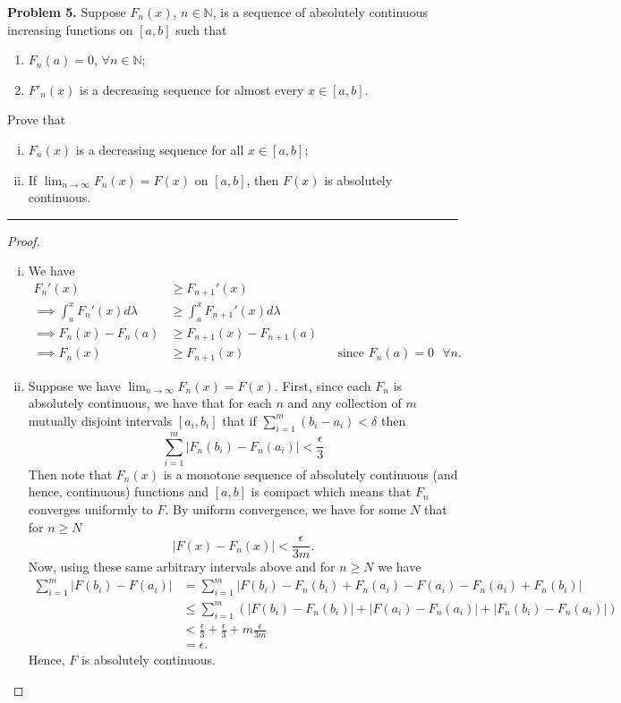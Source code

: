 \documentclass[leqno]{article}
\theoremstyle{nonumberplain}
\newtheorem{proof}{Proof}
\newcommand{\N}{\mathbb{N}}
\begin{document}

\noindent\textbf{Problem 5.} \quad
Suppose $F_n(x)$, $n\in \N$, is a sequence of absolutely continuous increasing functions on $[a,b]$ such that
\begin{enumerate}[(1)]
\item $F_n(a)=0$, $\forall n \in \N$;
\item $F'_n(x)$ is a decreasing sequence for almost every $x\in [a,b]$.
\end{enumerate}
Prove that
\begin{enumerate}[(i)]
\item $F_n(x)$ is a decreasing sequence for all $x \in [a,b]$;
\item If $\displaystyle{\lim_{n\to \infty} F_n(x)=F(x)}$ on $[a,b]$, then $F(x)$ is absolutely continuous.
\end{enumerate}


\noindent\rule[0.5ex]{\linewidth}{1pt}

\begin{proof}~
\begin{enumerate}[(i)]
\item We have
\begin{align*}
F_n'(x)&\geq F_{n+1}'(x)\\
\implies \int_a^x F_n'(x)d\lambda &\geq \int_a^x F_{n+1}'(x) d\lambda\\
\implies F_n(x)-F_n(a)&\geq F_{n+1}(x)-F_{n+1}(a)\\
\implies F_n(x)&\geq F_{n+1}(x) && \textrm{since $F_n(a)=0$ $\forall n$.}
\end{align*}

\item Suppose we have $\lim_{n\to \infty}F_n(x)=F(x)$. First, since each $F_n$ is absolutely continuous, we have that for each $n$ and any collection of $m$ mutually disjoint intervals $[a_i,b_i]$ that if $\sum_{i=1}^m (b_i-a_i)<\delta$ then 
\[
\sum_{i=1}^m |F_n(b_i)-F_n(a_i)|< \frac{\epsilon}{3}
\]
Then note that $F_n(x)$ is a monotone sequence of absolutely continuous (and hence, continuous) functions and $[a,b]$ is compact which means that $F_n$ converges uniformly to $F$.  By uniform convergence, we have for some $N$ that for $n\geq N$
\[
|F(x)-F_n(x)|< \frac{\epsilon}{3m}.
\]
Now, using these same arbitrary intervals above and for $n\geq N$ we have
\begin{align*}
\sum_{i=1}^m |F(b_i)-F(a_i)|&=\sum_{i=1}^m |F(b_i)-F_n(b_i)+F_n(a_i)-F(a_i)-F_n(a_i)+F_n(b_i)|\\
&\leq \sum_{i=1}^m \left( |F(b_i)-F_n(b_i)|+|F(a_i)-F_n(a_i)|+|F_n(b_i)-F_n(a_i)|\right)\\
&< \frac{\epsilon}{3}+\frac{\epsilon}{3}+m\frac{\epsilon}{3m}\\
&= \epsilon.
\end{align*}
Hence, $F$ is absolutely continuous.
\end{enumerate}
\end{proof}

\pagebreak
\end{document}
